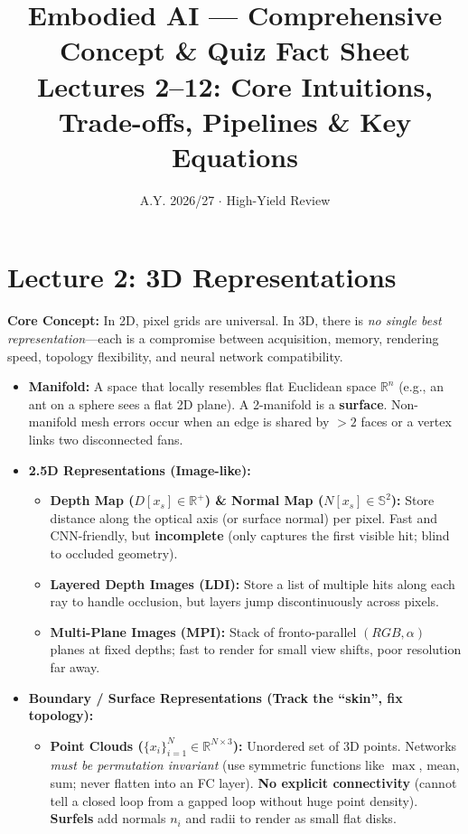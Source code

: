 \documentclass[10pt, a4paper]{article}
\title{\textbf{\textcolor{primary}{Embodied AI --- Comprehensive Concept \& Quiz Fact Sheet}}\\\large Lectures 2--12: Core Intuitions, Trade-offs, Pipelines \& Key Equations}
\author{A.Y. 2026/27 $\cdot$ High-Yield Review}
\date{\vspace{-2ex}}
\begin{document}
\maketitle

\section*{\textcolor{primary}{Lecture 2: 3D Representations}}
\textbf{Core Concept:} In 2D, pixel grids are universal. In 3D, there is \emph{no single best representation}---each is a compromise between acquisition, memory, rendering speed, topology flexibility, and neural network compatibility.

\begin{itemize}
    \item \textbf{Manifold:} A space that locally resembles flat Euclidean space $\mathbb{R}^n$ (e.g., an ant on a sphere sees a flat 2D plane). A 2-manifold is a \textbf{surface}. Non-manifold mesh errors occur when an edge is shared by $>2$ faces or a vertex links two disconnected fans.
    \item \textbf{2.5D Representations (Image-like):}
    \begin{itemize}
        \item \textbf{Depth Map ($D[x_s] \in \mathbb{R}^+$) \& Normal Map ($N[x_s] \in \mathbb{S}^2$):} Store distance along the optical axis (or surface normal) per pixel. Fast and CNN-friendly, but \textbf{incomplete} (only captures the first visible hit; blind to occluded geometry).
        \item \textbf{Layered Depth Images (LDI):} Store a list of multiple hits along each ray to handle occlusion, but layers jump discontinuously across pixels.
        \item \textbf{Multi-Plane Images (MPI):} Stack of fronto-parallel $(RGB, \alpha)$ planes at fixed depths; fast to render for small view shifts, poor resolution far away.
    \end{itemize}
    \item \textbf{Boundary / Surface Representations (Track the ``skin'', fix topology):}
    \begin{itemize}
        \item \textbf{Point Clouds ($\{x_i\}_{i=1}^N \in \mathbb{R}^{N \times 3}$):} Unordered set of 3D points. Networks \emph{must be permutation invariant} (use symmetric functions like $\max$, mean, sum; never flatten into an FC layer). \textbf{No explicit connectivity} (cannot tell a closed loop from a gapped loop without huge point density). \textbf{Surfels} add normals $n_i$ and radii to render as small flat disks.

\end{itemize}
\end{itemize}
\end{document}
